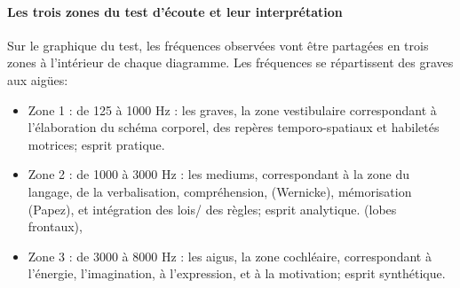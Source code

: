 \paragraph{Les trois zones du test d'écoute et leur interprétation}
Sur le graphique du test, les fréquences observées vont être partagées en
trois zones à l\textquoteright intérieur
de chaque diagramme. Les fréquences se répartissent des
graves aux aigües:
\begin{itemize}
	\item Zone 1 : de 125 à 1000 Hz : les graves, la zone vestibulaire correspondant à l'élaboration
	du schéma corporel, des repères temporo-spatiaux et habiletés motrices; 
	esprit pratique.
	\item Zone 2 : de 1000 à 3000 Hz : les mediums, correspondant à  la zone du langage, de la
	verbalisation, compréhension, (Wernicke),
	mémorisation (Papez), 
	et intégration des lois/
	des règles; esprit analytique.
	(lobes frontaux),
	\item Zone 3 : de 3000 à 8000 Hz : les aigus, la zone cochléaire, correspondant à l'énergie,
	 l'imagination, à l'expression, et à la motivation; esprit synthétique.
	
\end{itemize}
 
